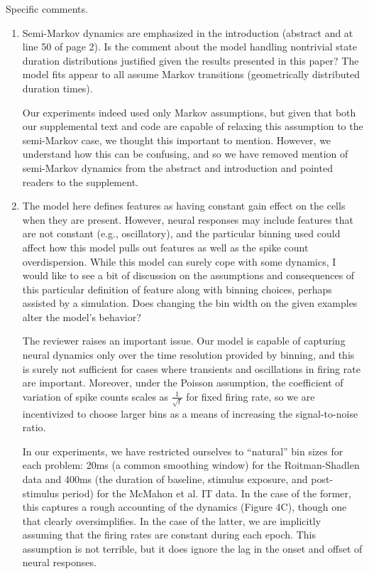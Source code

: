 \documentclass[12pt,a4paper]{article}
\newcommand{\edit}[1]{\textcolor{edit}{#1}}
\begin{document}
Specific comments.
\begin{enumerate}
\item Semi-Markov dynamics are emphasized in the introduction (abstract and at line 50 of page 2). Is the comment about the model handling nontrivial state duration distributions justified given the results presented in this paper? The model fits appear to all assume Markov transitions (geometrically distributed duration times).

\edit{
Our experiments indeed used only Markov assumptions, but given that both our supplemental text and code are capable of relaxing this assumption to the semi-Markov case, we thought this important to mention. However, we understand how this can be confusing, and so we have removed mention of semi-Markov dynamics from the abstract and introduction and pointed readers to the supplement.
}

\item The model here defines features as having constant gain effect on the cells when they are present. However, neural responses may include features that are not constant (e.g., oscillatory), and the particular binning used could affect how this model pulls out features as well as the spike count overdispersion. While this model can surely cope with some dynamics, I would like to see a bit of discussion on the assumptions and consequences of this particular definition of feature along with binning choices, perhaps assisted by a simulation. Does changing the bin width on the given examples alter the model’s behavior?

\edit{
The reviewer raises an important issue. Our model is capable of capturing neural dynamics only over the time resolution provided by binning, and this is surely not sufficient for cases where transients and oscillations in firing rate are important. Moreover, under the Poisson assumption, the coefficient of variation of spike counts scales as $\frac{1}{\sqrt{t}}$ for fixed firing rate, so we are incentivized to choose larger bins as a means of increasing the signal-to-noise ratio.
}

\edit{
In our experiments, we have restricted ourselves to ``natural'' bin sizes for each problem: 20ms (a common smoothing window) for the Roitman-Shadlen data and 400ms (the duration of baseline, stimulus exposure, and post-stimulus period) for the McMahon et al. IT data. In the case of the former, this captures a rough accounting of the dynamics (Figure 4C), though one that clearly oversimplifies. In the case of the latter, we are implicitly assuming that the firing rates are constant during each epoch. This assumption is not terrible, but it does ignore the lag in the onset and offset of neural responses.
}


\end{enumerate}
\end{document}

